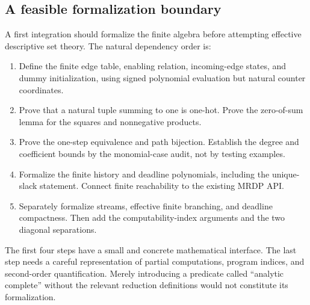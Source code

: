 \documentclass[11pt,letterpaper]{article}
\theoremstyle{definition}
\theoremstyle{remark}
\newcommand{\1}{\mathbf 1}
\begin{document}
\subsection{A feasible formalization boundary}
A first integration should formalize the finite algebra before attempting
effective descriptive set theory. The natural dependency order is:
\begin{enumerate}[label=(\arabic*)]
\item Define the finite edge table, enabling relation, incoming-edge states,
and dummy initialization, using signed polynomial evaluation but natural
counter coordinates.
\item Prove that a natural tuple summing to one is one-hot. Prove the
zero-of-sum lemma for the squares and nonnegative products.
\item Prove the one-step equivalence and path bijection. Establish the degree
and coefficient bounds by the monomial-case audit, not by testing examples.
\item Formalize the finite history and deadline polynomials, including the
unique-slack statement. Connect finite reachability to the existing MRDP API.
\item Separately formalize streams, effective finite branching, and deadline
compactness. Then add the computability-index arguments and the two diagonal
separations.
\end{enumerate}
The first four steps have a small and concrete mathematical interface. The
last step needs a careful representation of partial computations, program
indices, and second-order quantification. Merely introducing a predicate called
``analytic complete'' without the relevant reduction definitions would not
constitute its formalization.
\end{document}
